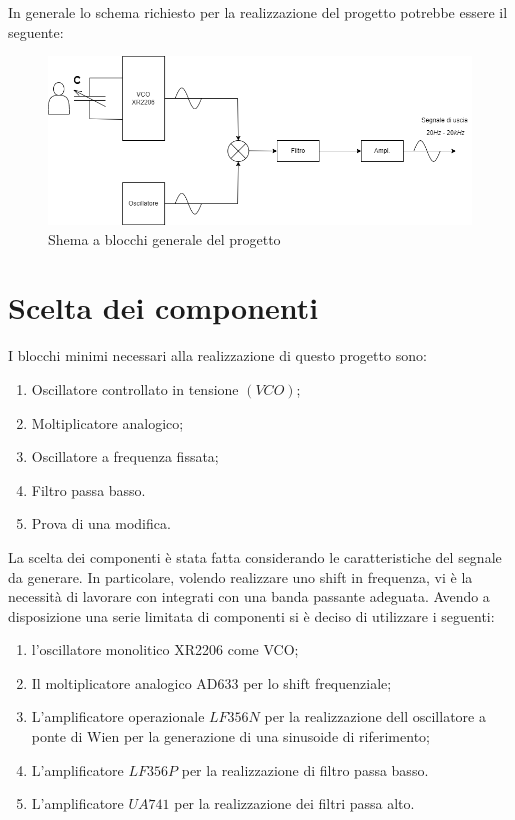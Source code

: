 \documentclass[titlepage]{report}
\begin{document}
	 In generale lo schema richiesto per la realizzazione del progetto potrebbe essere il seguente:
	 
	\begin{figure}[htbp]
		\centering
		\includegraphics[scale=0.5]{Immagini/Schema Generale PSEA.png}
		\caption{Shema a blocchi generale del progetto}
		\label{fig: schema a blocchi generico}
	\end{figure}	


\newpage

	
\chapter{Scelta dei componenti}
	\label{ch:Scelta_componenti}
	I blocchi minimi necessari alla realizzazione di questo progetto sono:
	
	\begin{enumerate}
		\item Oscillatore controllato in tensione $(VCO)$;
		\item Moltiplicatore analogico;
		\item Oscillatore a frequenza fissata;
		\item Filtro passa basso.
		\item Prova di una modifica.
	\end{enumerate}
	
	\noindent La scelta dei componenti è stata fatta considerando le caratteristiche del segnale da generare. In particolare, volendo realizzare uno shift in frequenza, vi è la necessità di lavorare con integrati con una banda passante adeguata.
	Avendo a disposizione una serie limitata di componenti si è deciso di utilizzare i seguenti:
	
	\begin{enumerate}
		\item l'oscillatore monolitico XR2206 come VCO;
		\item Il moltiplicatore analogico AD633 per lo shift frequenziale;
		\item L'amplificatore operazionale $LF356N$ per la realizzazione dell oscillatore a ponte di Wien per la generazione di una sinusoide di riferimento;
		\item L'amplificatore $LF356P$ per la realizzazione di filtro passa basso.
		\item L'amplificatore $UA741$ per la realizzazione dei filtri passa alto.
	\end{enumerate}
	
\end{document}
